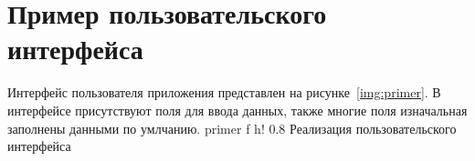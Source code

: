 \newpage
\section{Пример пользовательского интерфейса}

Интерфейс пользователя приложения представлен на рисунке~\ref{img:primer}.
В интерфейсе присутствуют поля для ввода данных, также многие поля изначальная заполнены данными по умлчанию.
{primer} %
{f} %
{h!} %
{0.8\textwidth} %
{Реализация пользовательского интерфейса} %






